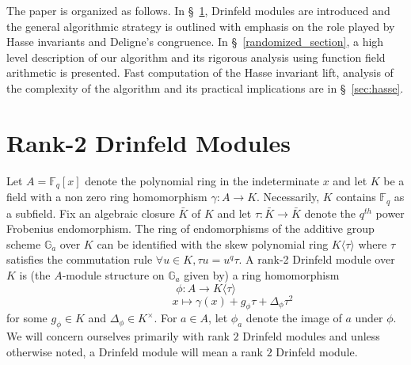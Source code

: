 \documentclass{article}
\theoremstyle{plain}
\theoremstyle{definition}
\def\F{\ensuremath{\mathbb{F}}}
\begin{document}
The paper is organized as follows. In \S~\ref{drinfeld_section}, Drinfeld modules are introduced 
and the general algorithmic strategy is outlined with emphasis on the role played by Hasse 
invariants and Deligne's congruence. In \S~\ref{randomized_section}, a high level description of 
our algorithm and its rigorous analysis using function field arithmetic is presented. Fast 
computation of the Hasse invariant lift, analysis of the complexity of the algorithm and its 
practical implications are in \S~\ref{sec:hasse}. 
 
 

\section{Rank-2 Drinfeld Modules}\label{drinfeld_section}
 Let $A=\F_q[x]$ denote the polynomial ring in the indeterminate $x$ and let $K$ be a field with a 
 non zero ring homomorphism $\gamma:A \rightarrow K$. Necessarily, $K$ contains $\F_q$ as a 
 subfield. Fix an algebraic closure $\bar{K}$ of $K$ and let $\tau: \bar{K} \longrightarrow 
 \bar{K}$ denote the $q^{th}$ power Frobenius endomorphism. The ring of endomorphisms of the 
 additive group scheme $\mathbb{G}_a$ over $K$ can be identified with the skew polynomial ring 
 $K\langle \tau \rangle$ where $\tau$ satisfies the commutation rule $\forall u \in K, \tau u = u^q 
 \tau$.
A rank-2 Drinfeld module over $K$ is (the $A$-module structure on $\mathbb{G}_a$ given by) a ring homomorphism
$$\phi : A \longrightarrow K\langle \tau \rangle$$ 
$$\ \ \ \ \ \ \ \ \ \ \ \ \ \ \ \ \ \ \ \ \ \ x \longmapsto \gamma(x) + g_\phi \tau + \Delta_\phi \tau^2$$
for some $g_\phi \in K$ and $\Delta_\phi \in K^\times$. For $a \in A$, let $\phi_a$ denote the image of $a$ under $\phi$. We will concern ourselves primarily with rank $2$ Drinfeld modules and unless otherwise noted, a Drinfeld module will mean a rank $2$ Drinfeld module.\\ \\
\end{document}
